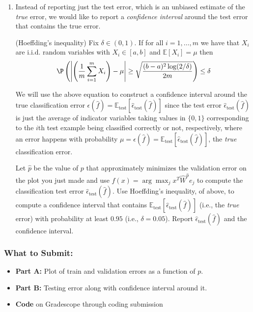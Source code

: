 \documentclass{article}
\begin{document}
\begin{bprob}
\begin{enumerate}
        \item {} Instead of reporting just the test error, which is an unbiased estimate of the \emph{true} error, we would like to report a \emph{confidence interval} around the test error that contains the true error.
        \begin{lemma}(Hoeffding's inequality)
            Fix $\delta \in (0,1)$. If for all $i=1,\dots,m$ we have that $X_i$ are i.i.d. random variables with $X_i \in [a,b]$ and $\mathbb{E}[X_i] = \mu$ then
            \begin{align*}
                \P\left( \left| \left(\frac{1}{m} \sum_{i=1}^m X_i\right) - \mu \right| \geq \sqrt{\frac{(b-a)^2\log(2/\delta)}{2m}} \right) \leq \delta
            \end{align*}
        \end{lemma}
        We will use the above equation to construct a confidence interval around the true classification error $\epsilon(\widehat{f})=\mathbb{E}_{\text{test}}[\widehat{\epsilon}_{\textrm{test}}(\widehat{f})]$ since the test error $\widehat{\epsilon}_{\textrm{test}}(\widehat{f})$ is just the average of indicator variables taking values in $\{0,1\}$ corresponding to the $i$th test example being classified correctly or not, respectively, where an error happens with probability $\mu=\epsilon(\widehat{f})=\mathbb{E}_{\text{test}}[\widehat{\epsilon}_{\textrm{test}}(\widehat{f})]$, the \emph{true} classification error. 
        
        Let $\widehat{p}$ be the value of $p$ that approximately minimizes the validation error on the plot you just made and use $\widehat{f}(x) = \arg\max_j x^T \widehat{W}^{\widehat{p}} e_j$ to compute the classification test error $\widehat{\epsilon}_{\textrm{test}}(\widehat{f})$. Use Hoeffding's inequality, of above, to compute a confidence interval that contains $\mathbb{E}_{\text{test}}[\widehat{\epsilon}_{\textrm{test}}(\widehat{f})]$ (i.e., the \emph{true} error) with probability at least $0.95$ (i.e., $\delta=0.05$). Report $\widehat{\epsilon}_{\textrm{test}}(\widehat{f})$ and the confidence interval. 
    \end{enumerate}
    
    \subsubsection*{What to Submit:}
    \begin{itemize}
        \item \textbf{Part A:} Plot of train and validation errors as a function of $p$.
        \item \textbf{Part B:} Testing error along with confidence interval around it.
        \item \textbf{Code} on Gradescope through coding submission
    \end{itemize}
\end{bprob}
\end{document}
